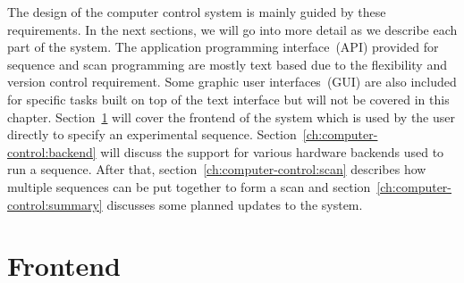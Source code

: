 The design of the computer control system is mainly guided by these requirements.
In the next sections, we will go into more detail as we describe each part of the system.
The application programming interface~(API) provided for sequence and scan programming
are mostly text based due to the flexibility and version control requirement.
Some graphic user interfaces~(GUI) are also included for specific tasks
built on top of the text interface but will not be covered in this chapter.
Section~\ref{ch:computer-control:frontend} will cover the frontend of the system
which is used by the user directly to specify an experimental sequence.
Section~\ref{ch:computer-control:backend} will discuss the support for various
hardware backends used to run a sequence.
After that, section~\ref{ch:computer-control:scan} describes how multiple sequences
can be put together to form a scan and section~\ref{ch:computer-control:summary}
discusses some planned updates to the system.

\section{Frontend}
\label{ch:computer-control:frontend}


